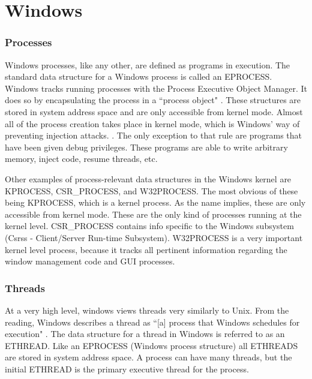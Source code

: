 \documentclass[10pt,draftclsnofoot,onecolumn]{IEEEtran}
\begin{document}
\section{Windows}

\subsubsection{Processes}
\label{sub:Process Windows}
\par Windows processes, like any other, are defined as programs in execution.
The standard data structure for a Windows process is called an EPROCESS.
Windows tracks running processes with the Process Executive Object Manager.
It does so by encapsulating the process in a ``process object" \cite{win:1}.
These structures are stored in system address space and are only accessible from kernel mode.
Almost all of the process creation takes place in kernel mode, which is Windows' way of preventing injection attacks. \cite{win:1}.
The only exception to that rule are programs that have been given debug privileges.
These programs are able to write arbitrary memory, inject code, resume threads, etc. \cite{win:1}

\par Other examples of process-relevant data structures in the Windows kernel are KPROCESS, CSR\_PROCESS, and W32PROCESS.
The most obvious of these being KPROCESS, which is a kernel process.
As the name implies, these are only accessible from kernel mode.
These are the only kind of processes running at the kernel level.
CSR\_PROCESS contains info specific to the Windows subsystem (Csrss - Client/Server Run-time Subsystem).
W32PROCESS is a very important kernel level process, because it tracks all pertinent information regarding the window management code and GUI processes.\\

\subsubsection{Threads}
\label{sub:Thread Windows}
\par At a very high level, windows views threads very similarly to Unix.
From the reading, Windows describes a thread as ``[a] process that Windows schedules for execution" \cite{win:1}.
The data structure for a thread in Windows is referred to as an ETHREAD.
Like an EPROCESS (Windows process structure) all ETHREADS are stored in system address space.
A process can have many threads, but the initial ETHREAD is the primary executive thread for the process.
\end{document}
